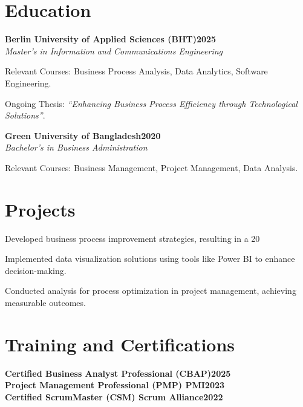 \documentclass[letterpaper,10pt]{article}
\newcommand{\heading}[2]{
  \hspace{10pt}#1\hfill#2\\
}
\newcommand{\headingBf}[2]{
  \heading{\textbf{#1}}{\textbf{#2}}
}
\newcommand{\headingIt}[2]{
  \heading{\textit{#1}}{\textit{#2}}
}
\newenvironment{resume_list}{
  \vspace{-7pt}
  \begin{itemize}[itemsep=-2px, parsep=1pt, leftmargin=20pt, labelsep=10pt]
}{
  \end{itemize}
}
\begin{document}
\newpage
\section{Education}

\headingBf{Berlin University of Applied Sciences (BHT)}{2025}
\headingIt{Master's in Information and Communications Engineering}{}
\begin{resume_list}
  \item Relevant Courses: Business Process Analysis, Data Analytics, Software Engineering.
  \item Ongoing Thesis: \textit{“Enhancing Business Process Efficiency through Technological Solutions”}.
\end{resume_list}

\headingBf{Green University of Bangladesh}{2020}
\headingIt{Bachelor's in Business Administration}{}
\begin{resume_list}
  \item Relevant Courses: Business Management, Project Management, Data Analysis.
\end{resume_list}

\vspace{-1em}

\section{Projects}

\begin{resume_list}
    \item Developed business process improvement strategies, resulting in a 20%
    \item Implemented data visualization solutions using tools like Power BI to enhance decision-making.
    \item Conducted analysis for process optimization in project management, achieving measurable outcomes.
\end{resume_list}

\vspace{-1em}

\section{Training and Certifications}

\headingBf{Certified Business Analyst Professional (CBAP)}{2025}
\headingBf{Project Management Professional (PMP) \textnormal{PMI}}{2023}
\headingBf{Certified ScrumMaster (CSM) \textnormal{Scrum Alliance}}{2022}
\end{document}
